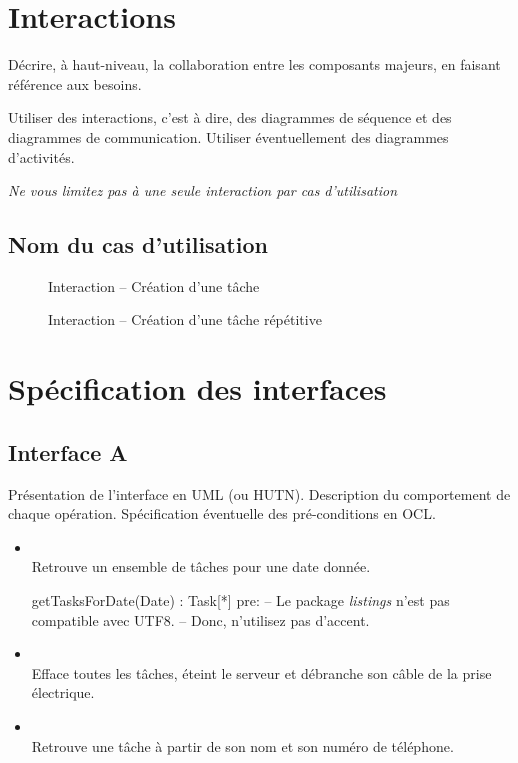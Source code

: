 		\section{Interactions}

Décrire, à haut-niveau, la collaboration entre les composants majeurs, en faisant référence aux besoins.

Utiliser des interactions, c'est à dire, des diagrammes de séquence et des diagrammes de communication. Utiliser éventuellement des diagrammes d'activités.

\emph{Ne vous limitez pas à une seule interaction par cas d'utilisation}

\subsection{Nom du cas d'utilisation}

\begin{figure}[htbp]
	\centering
	\caption{Interaction \--- Création d'une tâche}
	\label{fig:label}
\end{figure}

\begin{figure}[htbp]
	\centering
	\caption{Interaction \--- Création d'une tâche répétitive}
	\label{fig:label}
\end{figure}



		\section{Spécification des interfaces}

		\subsection{Interface A}
	
Présentation de l'interface en UML (ou HUTN). Description du comportement de chaque opération. Spécification éventuelle des pré-conditions en OCL.
	
\begin{itemize}
	\item {} \\
	Retrouve un ensemble de tâches pour une date donnée.
\begin{ocl}
getTasksForDate(Date) : Task[*]
pre: 
-- Le package \emph{listings} n'est pas compatible avec UTF8.
-- Donc, n'utilisez pas d'accent.
\end{ocl}
	
	\item {} \\
	Efface toutes les tâches, éteint le serveur et débranche son câble de la prise électrique.
	
	\item {} \\
	Retrouve une tâche à partir de son nom et son numéro de téléphone.
\end{itemize}	

